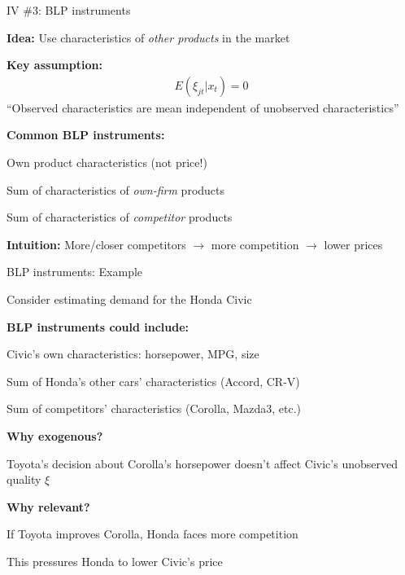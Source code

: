 \documentclass[notes,11pt, aspectratio=169]{beamer}
\newenvironment{wideitemize}{\itemize\addtolength{\itemsep}{10pt}}{\enditemize}
\newenvironment{wideenumerate}{\enumerate\addtolength{\itemsep}{10pt}}{\endenumerate}
\begin{document}
\begin{frame}{IV \#3: BLP instruments}
	\begin{wideitemize}
		\item \textbf{Idea:} Use characteristics of \textit{other products} in the market
		\item \textbf{Key assumption:}
		\begin{align*}
			E(\xi_{jt} | x_{t}) = 0
		\end{align*}
		``Observed characteristics are mean independent of unobserved characteristics''
		\item \textbf{Common BLP instruments:}
		\begin{wideenumerate}
			\vspace{5pt}
			\item Own product characteristics (not price!)
			\item Sum of characteristics of \textit{own-firm} products
			\item Sum of characteristics of \textit{competitor} products
		\end{wideenumerate}
		\item \textbf{Intuition:} More/closer competitors $\rightarrow$ more competition $\rightarrow$ lower prices
	\end{wideitemize}
\end{frame}

\begin{frame}{BLP instruments: Example}
	\begin{wideitemize}
		\item Consider estimating demand for the Honda Civic
		\item \textbf{BLP instruments could include:}
		\begin{wideitemize}
			\vspace{3pt}
			\item Civic's own characteristics: horsepower, MPG, size
			\item Sum of Honda's other cars' characteristics (Accord, CR-V)
			\item Sum of competitors' characteristics (Corolla, Mazda3, etc.)
		\end{wideitemize} \pause
		\item \textbf{Why exogenous?}
		\begin{wideitemize}
			\vspace{3pt}
			\item Toyota's decision about Corolla's horsepower doesn't affect Civic's unobserved quality $\xi$
		\end{wideitemize}
		\item \textbf{Why relevant?}
		\begin{wideitemize}
			\vspace{3pt}
			\item If Toyota improves Corolla, Honda faces more competition
			\item This pressures Honda to lower Civic's price
		\end{wideitemize}
	\end{wideitemize}
\end{frame}
\end{document}
